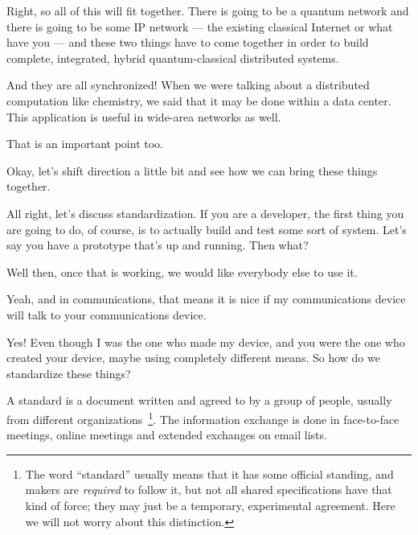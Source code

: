 \rrr Right, so all of this will fit together. There is going to be a quantum network and there is going to be some IP network --- the existing classical Internet or what have you --- and these two things have to come together in order to build complete, integrated, hybrid quantum-classical distributed systems.

\mmm And they are all synchronized!
When we were talking about a distributed computation like chemistry, we said that it may be done within a data center. This application is useful in wide-area networks as well.

\rrr That is an important point too.

\mmm Okay, let's shift direction a little bit and see how we can bring these things together.

\rrr All right, let's discuss standardization. If you are a developer, the first thing you are going to do, of course, is to actually build and test some sort of system. Let's say you have a prototype that's up and running. Then what?

\mmm Well then, once that is working, we would like everybody else to use it.

\rrr Yeah, and in communications, that means it is nice if my communications device will talk to your communications device.

\mmm Yes! Even though I was the one who made my device, and you were the one who created your device, maybe using completely different means. So how do we standardize these things?

\rrr A standard is a document written and agreed to by a group of people, usually from different organizations~\footnote{The word ``standard'' usually means that it has some official standing, and makers are \emph{required} to follow it, but not all shared specifications have that kind of force; they may just be a temporary, experimental agreement. Here we will not worry about this distinction.}. The information exchange is done in face-to-face meetings, online meetings and extended exchanges on email lists.

